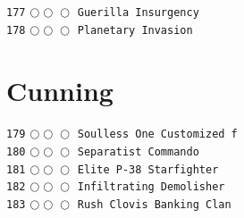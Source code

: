 \documentclass[a4paper,landscape]{article}
\begin{document}
\begin{multicols*}{5}
\texttt{177} \(\bigcirc\!\bigcirc\!\bigcirc\)  \texttt{Guerilla Insurgency} \vspace{-0.3mm}\\ 
\texttt{178} \(\bigcirc\!\bigcirc\!\bigcirc\)  \texttt{Planetary Invasion} \vspace{-0.3mm}\\ 
\section{Cunning} 
\vspace{-2mm} 
\texttt{179} \(\bigcirc\!\bigcirc\!\bigcirc\)  \texttt{Soulless One Customized f} \vspace{-0.3mm}\\ 
\texttt{180} \(\bigcirc\!\bigcirc\!\bigcirc\)  \texttt{Separatist Commando} \vspace{-0.3mm}\\ 
\texttt{181} \(\bigcirc\!\bigcirc\!\bigcirc\)  \texttt{Elite P-38 Starfighter} \vspace{-0.3mm}\\ 
\texttt{182} \(\bigcirc\!\bigcirc\!\bigcirc\)  \texttt{Infiltrating Demolisher} \vspace{-0.3mm}\\ 
\texttt{183} \(\bigcirc\!\bigcirc\!\bigcirc\)  \texttt{Rush Clovis Banking Clan } \vspace{-0.3mm}\\ 

\end{multicols*}
\end{document}
